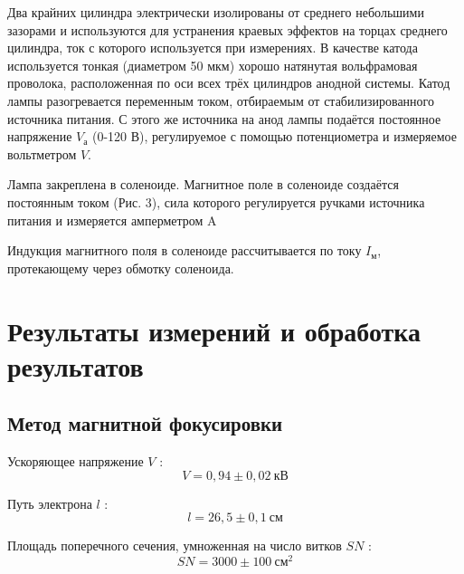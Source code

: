 Два крайних цилиндра электрически изолированы от среднего небольшими зазорами и используются для
устранения краевых эффектов на торцах среднего цилиндра, ток с которого используется при измерениях.
В качестве катода используется тонкая (диаметром 50 мкм) хорошо натянутая вольфрамовая проволока,
расположенная по оси всех трёх цилиндров анодной системы. Катод лампы разогревается переменным
током, отбираемым от стабилизированного источника питания. С этого же источника на анод лампы
подаётся постоянное напряжение $V_\text{а}$
(0-120 В), регулируемое с помощью потенциометра и измеряемое вольтметром $V$.

Лампа закреплена в соленоиде. Магнитное поле в соленоиде создаётся постоянным током (Рис. 3), сила которого регулируется ручками источника питания и измеряется амперметром A

Индукция магнитного поля в соленоиде рассчитывается по току $I_\text{м}$, протекающему через обмотку соленоида. 

\section{Результаты измерений и обработка результатов}
\subsection*{Метод магнитной фокусировки}
Ускоряющее напряжение $V$ :
\[
    V = 0,94 \pm 0,02\ \text{кВ}
\] 

Путь электрона $l$ :
\[
    l = 26,5 \pm 0,1\ \text{см}
\] 

Площадь поперечного сечения, умноженная на число витков $SN$ :
\[
    SN = 3000 \pm 100\ \text{см}^2
\] 

